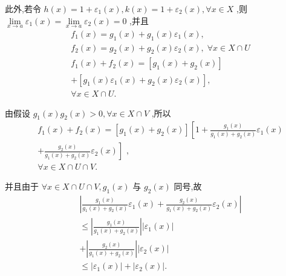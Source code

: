 此外,若令 $h\left( x\right)  = 1 + {\varepsilon }_{1}\left( x\right) ,k\left( x\right)  = 1 + {\varepsilon }_{2}\left( x\right) ,\forall x \in  X$ ,则 $\mathop{\lim }\limits_{{x \rightarrow  a}}{\varepsilon }_{1}\left( x\right)  = \mathop{\lim }\limits_{{x \rightarrow  a}}{\varepsilon }_{2}\left( x\right)  = 0$ ,并且
\begin{align*}
	&{f}_{1}\left( x\right)  = {g}_{1}\left( x\right)  + {g}_{1}\left( x\right) {\varepsilon }_{1}\left( x\right) ,\\
	&{f}_{2}\left( x\right)  = {g}_{2}\left( x\right)  + {g}_{2}\left( x\right) {\varepsilon }_{2}\left( x\right) ,\;\forall x \in  X \cap  U\\
	&{f}_{1}\left( x\right)  + {f}_{2}\left( x\right)  = \left\lbrack  {{g}_{1}\left( x\right)  + {g}_{2}\left( x\right) }\right\rbrack\\
	&+ \left\lbrack  {{g}_{1}\left( x\right) {\varepsilon }_{1}\left( x\right)  + {g}_{2}\left( x\right) {\varepsilon }_{2}\left( x\right) }\right\rbrack  ,\\
	&\forall x \in  X \cap  U.
\end{align*}

由假设 ${g}_{1}\left( x\right) {g}_{2}\left( x\right)  > 0,\forall x \in  X \cap  V$ ,所以
\begin{align*}
	&{f}_{1}\left( x\right)  + {f}_{2}\left( x\right)  = \left\lbrack  {{g}_{1}\left( x\right)  + {g}_{2}\left( x\right) }\right\rbrack  \left\lbrack  {1 + \frac{{g}_{1}\left( x\right) }{{g}_{1}\left( x\right)  + {g}_{2}\left( x\right) }{\varepsilon }_{1}\left( x\right) }\right.\\
	&\left. {+\frac{{g}_{2}\left( x\right) }{{g}_{1}\left( x\right)  + {g}_{2}\left( x\right) }{\varepsilon }_{2}\left( x\right) }\right\rbrack  \text{ , }\\
	&\forall x \in  X \cap  U \cap  V.
\end{align*}

并且由于 $\forall x \in  X \cap  U \cap  V,{g}_{1}\left( x\right)$ 与 ${g}_{2}\left( x\right)$ 同号,故
\begin{align*}
	&\left| {\frac{{g}_{1}\left( x\right) }{{g}_{1}\left( x\right)  + {g}_{2}\left( x\right) }{\varepsilon }_{1}\left( x\right)  + \frac{{g}_{2}\left( x\right) }{{g}_{1}\left( x\right)  + {g}_{2}\left( x\right) }{\varepsilon }_{2}\left( x\right) }\right|\\
	&\leq  \left| \frac{{g}_{1}\left( x\right) }{{g}_{1}\left( x\right)  + {g}_{2}\left( x\right) }\right| \left| {{\varepsilon }_{1}\left( x\right) }\right|\\
	&+ \left| \frac{{g}_{2}\left( x\right) }{{g}_{1}\left( x\right)  + {g}_{2}\left( x\right) }\right| \left| {{\varepsilon }_{2}\left( x\right) }\right|\\
	&\leq  \left| {{\varepsilon }_{1}\left( x\right) }\right|  + \left| {{\varepsilon }_{2}\left( x\right) }\right| .
\end{align*}


